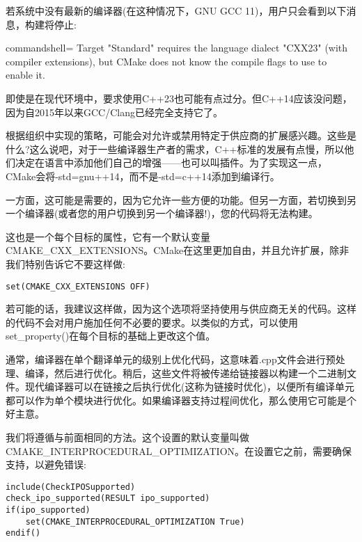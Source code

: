 若系统中没有最新的编译器(在这种情况下，GNU GCC 11)，用户只会看到以下消息，构建将停止:

\begin{tcblisting}{commandshell={}}
Target "Standard" requires the language dialect "CXX23" (with
compiler extensions), but CMake does not know the compile flags
to use to enable it.
\end{tcblisting}

即使是在现代环境中，要求使用C++23也可能有点过分。但C++14应该没问题，因为自2015年以来GCC/Clang已经完全支持它了。


根据组织中实现的策略，可能会对允许或禁用特定于供应商的扩展感兴趣。这些是什么?这么说吧，对于一些编译器生产者的需求，C++标准的发展有点慢，所以他们决定在语言中添加他们自己的增强——也可以叫插件。为了实现这一点，CMake会将-std=gnu++14，而不是-std=c++14添加到编译行。

一方面，这可能是需要的，因为它允许一些方便的功能。但另一方面，若切换到另一个编译器(或者您的用户切换到另一个编译器!)，您的代码将无法构建。

这也是一个每个目标的属性，它有一个默认变量CMAKE\_CXX\_EXTENSIONS。CMake在这里更加自由，并且允许扩展，除非我们特别告诉它不要这样做:

\begin{lstlisting}[style=styleCMake]
set(CMAKE_CXX_EXTENSIONS OFF)
\end{lstlisting}

若可能的话，我建议这样做，因为这个选项将坚持使用与供应商无关的代码。这样的代码不会对用户施加任何不必要的要求。以类似的方式，可以使用set\_property()在每个目标的基础上更改这个值。


通常，编译器在单个翻译单元的级别上优化代码，这意味着.cpp文件会进行预处理、编译，然后进行优化。稍后，这些文件将被传递给链接器以构建一个二进制文件。现代编译器可以在链接之后执行优化(这称为链接时优化)，以便所有编译单元都可以作为单个模块进行优化。如果编译器支持过程间优化，那么使用它可能是个好主意。

我们将遵循与前面相同的方法。这个设置的默认变量叫做CMAKE\_INTERPROCEDURAL\_OPTIMIZATION。在设置它之前，需要确保支持，以避免错误:

\begin{lstlisting}[style=styleCMake]
include(CheckIPOSupported)
check_ipo_supported(RESULT ipo_supported)
if(ipo_supported)
	set(CMAKE_INTERPROCEDURAL_OPTIMIZATION True)
endif()
\end{lstlisting}

